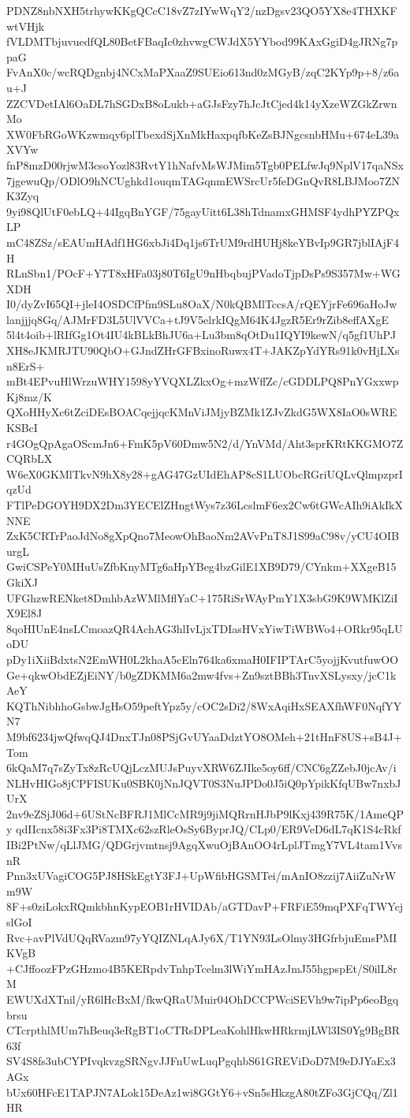 PDNZ8nbNXH5trhywKKgQCcC18vZ7zIYwWqY2/nzDgsv23QO5YX8e4THXKFwtVHjk
fVLDMTbjuvuedfQL80BetFBaqIc0zhvwgCWJdX5YYbod99KAxGgiD4gJRNg7ppaG
FvAnX0c/wcRQDgnbj4NCxMaPXaaZ9SUEio613nd0zMGyB/zqC2KYp9p+8/z6au+J
ZZCVDetIAl6OaDL7hSGDxB8oLukb+aGJsFzy7hJcJtCjed4k14yXzeWZGkZrwnMo
XW0FbRGoWKzwmqy6plTbexdSjXnMkHaxpqfbKeZsBJNgcsnbHMu+674eL39aXVYw
fnP8mzD00rjwM3csoYozl83RvtY1hNafvMsWJMim5Tgb0PELfwJq9NplV17qaNSx
7jgewuQp/ODlO9hNCUghkd1ouqmTAGqnmEWSrcUr5feDGnQvR8LBJMoo7ZNK3Zyq
9yi98QlUtF0ebLQ+44IgqBnYGF/75gayUitt6L38hTdnamxGHMSF4ydhPYZPQxLP
mC48ZSz/sEAUmHAdf1HG6xbJi4Dq1js6TrUM9rdHUHj8keYBvIp9GR7jblIAjF4H
RLnSbn1/POcF+Y7T8xHFa03j80T6IgU9nHbqbujPVadoTjpDsPs9S357Mw+WGXDH
I0/dyZvI65QI+jleI4OSDCfPfm9SLu8OaX/N0kQBMlTccsA/rQEYjrFe696aHoJw
lanjjjq8Gq/AJMrFD3L5UlVVCa+tJ9V5elrkIQgM64K4JgzR5Er9rZib8effAXgE
5l4t4oib+lRIfGg1Ot4IU4kBLkBhJU6a+Lu3bm8qOtDu1IQYI9kewN/q5gf1UhPJ
XH8eJKMRJTU90QbO+GJndZHrGFBxinoRuwx4T+JAKZpYdYRs91k0vHjLXsn8ErS+
mBt4EPvuHlWrzuWHY1598yYVQXLZkxOg+mzWffZc/cGDDLPQ8PnYGxxwpKj8mz/K
QXoHHyXc6tZciDEsBOACqejjqcKMnViJMjyBZMk1ZJvZkdG5WX8IaO0sWREKSBcI
r4GOgQpAgaOScmJn6+FmK5pV60Dmw5N2/d/YnVMd/Aht3sprKRtKKGMO7ZCQRbLX
W6eX0GKMlTkvN9hX8y28+gAG47GzUIdEhAP8cS1LUObcRGriUQLvQlmpzprIqzUd
FTlPeDGOYH9DX2Dm3YECElZHngtWys7z36LcslmF6ex2Cw6tGWcAIh9iAkIkXNNE
ZxK5CRTrPaoJdNo8gXpQno7MeowOhBaoNm2AVvPnT8J1S99aC98v/yCU4OIBurgL
GwiCSPeY0MHuUsZfbKnyMTg6aHpYBeg4bzGilE1XB9D79/CYnkm+XXgeB15GkiXJ
UFGhzwRENket8DmhbAzWMlMflYaC+175RiSrWAyPmY1X3sbG9K9WMKlZiIX9El8J
8qoHIUnE4nsLCmoazQR4AchAG3hlIvLjxTDIasHVxYiwTiWBWo4+ORkr95qLUoDU
pDy1iXiiBdxtsN2EmWH0L2khaA5cEln764ka6xmaH0IFIPTArC5yojjKvutfuwOO
Ge+qkwObdEZjEiNY/b0gZDKMM6a2mw4fvs+Zn9sztBBh3TnvXSLysxy/jcC1kAeY
KQThNibhhoGsbwJgHsO59peftYpz5y/cOC2sDi2/8WxAqiHxSEAXfhWF0NqfYYN7
M9bf6234jwQfwqQJ4DnxTJn08PSjGvUYaaDdztYO8OMeh+21tHnF8US+sB4J+Tom
6kQaM7q7sZyTx8zRcUQjLczMUJsPuyvXRW6ZJIke5oy6ff/CNC6gZZebJ0jcAv/i
NLHvHIGo8jCPFISUKu0SBK0jNnJQVT0S3NuJPDo0J5iQ0pYpikKfqUBw7nxbJUrX
2nv9eZSjJ06d+6UStNcBFRJ1MlCcMR9j9jiMQRrnHJbP9lKxj439R75K/1AmeQPy
qdIIcnx58i3Fx3Pi8TMXc62szRleOsSy6ByprJQ/CLp0/ER9VeD6dL7qK1S4cRkf
IBi2PtNw/qLlJMG/QDGrjvmtnsj9AgqXwuOjBAnOO4rLplJTmgY7VL4tam1VvsnR
Pnn3xUVagiCOG5PJ8HSkEgtY3FJ+UpWfibHGSMTei/mAnIO8zzij7AiiZuNrWm9W
8F+s0ziLokxRQmkbhnKypEOB1rHVIDAb/aGTDavP+FRFiE59mqPXFqTWYcjslGoI
Rvc+avPlVdUQqRVazm97yYQIZNLqAJy6X/T1YN93LsOlmy3HGfrbjuEmsPMIKVgB
+CJffoozFPzGHzmo4B5KERpdvTnhpTcelm3lWiYmHAzJmJ55hgpspEt/S0ilL8rM
EWUXdXTnil/yR6lHcBxM/fkwQRaUMuir04OhDCCPWciSEVh9w7ipPp6eoBgqbrsu
CTcrpthlMUm7hBeuq3eRgBT1oCTRsDPLeaKohlHkwHRkrmjLWl3IS0Yg9BgBR63f
SV4S8fs3ubCYPIvqkvzgSRNgvJJFnUwLuqPgqhbS61GREViDoD7M9eDJYaEx3AGx
bUx60HFcE1TAPJN7ALok15DeAz1wi8GGtY6+vSn5sHkzgA80tZFo3GjCQq/Zl1HR

